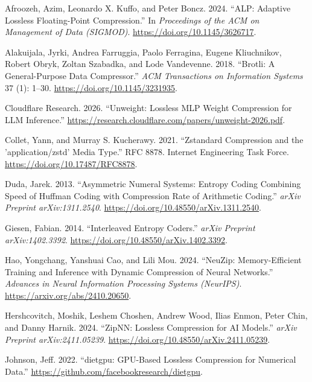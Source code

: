 \documentclass[
]{article}
\newlength{\cslhangindent}
\newenvironment{CSLReferences}[2] %
 {\begin{list}{}{%
  \setlength{\itemindent}{0pt}
  \setlength{\leftmargin}{0pt}
  \setlength{\parsep}{0pt}
  \ifodd #1
   \setlength{\leftmargin}{\cslhangindent}
   \setlength{\itemindent}{-1\cslhangindent}
  \fi
  \setlength{\itemsep}{#2\baselineskip}}}
 {\end{list}}
\begin{document}
\label{refs}
\begin{CSLReferences}{1}{0}
Afroozeh, Azim, Leonardo X. Kuffo, and Peter Boncz. 2024. {``{ALP}:
Adaptive Lossless Floating-Point Compression.''} In \emph{Proceedings of
the ACM on Management of Data (SIGMOD)}.
\url{https://doi.org/10.1145/3626717}.

Alakuijala, Jyrki, Andrea Farruggia, Paolo Ferragina, Eugene
Kliuchnikov, Robert Obryk, Zoltan Szabadka, and Lode Vandevenne. 2018.
{``Brotli: A General-Purpose Data Compressor.''} \emph{ACM Transactions
on Information Systems} 37 (1): 1--30.
\url{https://doi.org/10.1145/3231935}.

Cloudflare Research. 2026. {``Unweight: Lossless {MLP} Weight
Compression for {LLM} Inference.''}
\url{https://research.cloudflare.com/papers/unweight-2026.pdf}.

Collet, Yann, and Murray S. Kucherawy. 2021. {``Zstandard Compression
and the {'application/zstd'} Media Type.''} RFC 8878. Internet
Engineering Task Force. \url{https://doi.org/10.17487/RFC8878}.

Duda, Jarek. 2013. {``Asymmetric Numeral Systems: Entropy Coding
Combining Speed of {H}uffman Coding with Compression Rate of Arithmetic
Coding.''} \emph{arXiv Preprint arXiv:1311.2540}.
\url{https://doi.org/10.48550/arXiv.1311.2540}.

Giesen, Fabian. 2014. {``Interleaved Entropy Coders.''} \emph{arXiv
Preprint arXiv:1402.3392}.
\url{https://doi.org/10.48550/arXiv.1402.3392}.

Hao, Yongchang, Yanshuai Cao, and Lili Mou. 2024. {``{NeuZip}:
Memory-Efficient Training and Inference with Dynamic Compression of
Neural Networks.''} \emph{Advances in Neural Information Processing
Systems (NeurIPS)}. \url{https://arxiv.org/abs/2410.20650}.

Hershcovitch, Moshik, Leshem Choshen, Andrew Wood, Ilias Enmon, Peter
Chin, and Danny Harnik. 2024. {``{ZipNN}: Lossless Compression for {AI}
Models.''} \emph{arXiv Preprint arXiv:2411.05239}.
\url{https://doi.org/10.48550/arXiv.2411.05239}.

Johnson, Jeff. 2022. {``{dietgpu}: GPU-Based Lossless Compression for
Numerical Data.''} \url{https://github.com/facebookresearch/dietgpu}.


\end{CSLReferences}
\end{document}
